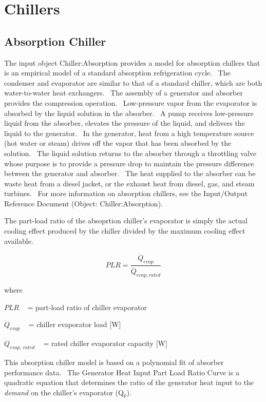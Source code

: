 \section{Chillers }\label{chillers}

\subsection{Absorption Chiller}\label{absorption-chiller}

The input object Chiller:Absorption provides a model for absorption chillers that is an empirical model of a standard absorption refrigeration cycle.~ The condenser and evaporator are similar to that of a standard chiller, which are both water-to-water heat exchangers.~ The assembly of a generator and absorber provides the compression operation.~ Low-pressure vapor from the evaporator is absorbed by the liquid solution in the absorber.~ A pump receives low-pressure liquid from the absorber, elevates the pressure of the liquid, and delivers the liquid to the generator.~ In the generator, heat from a high temperature source (hot water or steam) drives off the vapor that has been absorbed by the solution.~ The liquid solution returns to the absorber through a throttling valve whose purpose is to provide a pressure drop to maintain the pressure difference between the generator and absorber.~ The heat supplied to the absorber can be waste heat from a diesel jacket, or the exhaust heat from diesel, gas, and steam turbines.~ For more information on absorption chillers, see the Input/Output Reference Document (Object: Chiller:Absorption).

The part-load ratio of the absoprtion chiller's evaporator is simply the actual cooling effect produced by the chiller divided by the maximum cooling effect available.

\begin{equation}
PLR = \frac{\dot{Q}_{evap}}{\dot{Q}_{evap,rated}}
\end{equation}

where

\(PLR\) ~ = part-load ratio of chiller evaporator

\({\dot Q_{evap}}\) ~ = chiller evaporator load {[}W{]}

\({\dot Q_{evap,\,rated}}\) ~ = rated chiller evaporator capacity {[}W{]}

This absorption chiller model is based on a polynomial fit of absorber performance data.~ The Generator Heat Input Part Load Ratio Curve is a quadratic equation that determines the ratio of the generator heat input to the \emph{demand} on the chiller's evaporator (Q\(_{p}\)).

